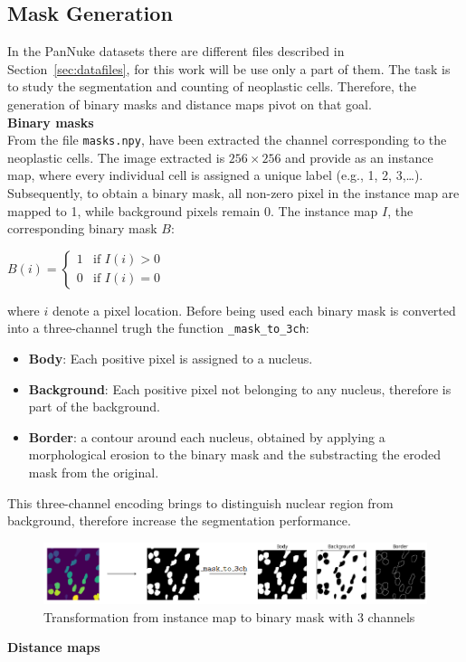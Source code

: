 \documentclass[target=bach,aauheader=,style=]{thud}
\begin{document}
\subsection{Mask Generation}
In the PanNuke datasets there are different files described in Section~\ref{sec:datafiles}, for this work will be use only a part of them. The task is to study the segmentation and counting of neoplastic cells. Therefore, the generation of binary masks and distance maps pivot on that goal.\\

\noindent\textbf{Binary masks}\\
From the file \texttt{masks.npy}, have been extracted the channel corresponding to the neoplastic cells. The image extracted is $256 \times 256$ and provide as an instance map, where every individual cell is assigned a unique label (e.g., 1, 2, 3,\dots). Subsequently, to obtain a binary mask, all non-zero pixel in the instance map are mapped to 1, while background pixels remain 0. The instance map $I$, the corresponding binary mask $B$:
\begin{center}
$
B(i) = 
\begin{cases}
1 & \text{if } I(i) > 0 \\
0 & \text{if } I(i) = 0
\end{cases}
$
\end{center}
where $i$ denote a pixel location. Before being used each binary mask is converted into a three-channel trugh the function \texttt{\_mask\_to\_3ch}:
\begin{itemize}
    \item \textbf{Body}: Each positive pixel is assigned to a nucleus.
    \item \textbf{Background}: Each positive pixel not belonging to any nucleus, therefore is part of the background.
    \item \textbf{Border}: a contour around each nucleus, obtained by applying a morphological erosion to the binary mask and the substracting the eroded mask from the original.
\end{itemize}
This three-channel encoding brings to distinguish nuclear region from background, therefore increase the segmentation performance.\\
\begin{figure}[H] %
    \centering
    \includegraphics[width=1\textwidth]{imgs/binarymask_transform.png}
    \caption{Transformation from instance map to binary mask with 3 channels}
    \label{fig:esempio}
\end{figure}
\noindent\textbf{Distance maps}\\
\end{document}
